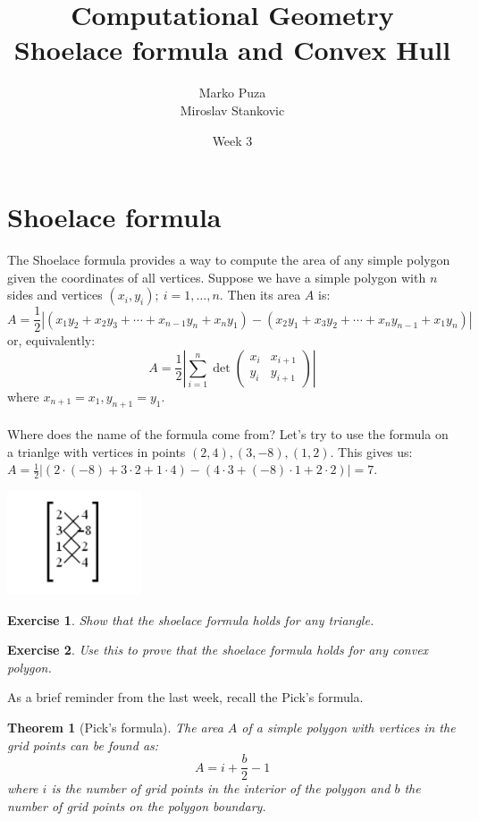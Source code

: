 \documentclass{article}
\title{\textbf{Computational Geometry}\\Shoelace formula and Convex Hull}
\date{Week 3}
\author{Marko Puza \\ Miroslav Stankovic}
\newtheorem*{theorem}{Theorem}
\newtheorem{exercise}{Exercise}
\begin{document}
\maketitle

\section*{Shoelace formula}
The Shoelace formula provides a way to compute the area of any simple polygon given the coordinates of all vertices. Suppose we have a simple polygon with $n$ sides and vertices $(x_i, y_i); \ i = 1, \dots, n$. Then its area $A$ is: \[A = \frac{1}{2} |(x_1 y_2 + x_2 y_3 + \cdots + x_{n-1} y_n + x_n y_1)  - (x_2 y_1 + x_3 y_2 + \cdots + x_n y_{n-1} + x_1 y_n)|\]
or, equivalently:
\[A = \frac{1}{2}|\sum_{i=1}^n \det{\left( \begin{smallmatrix} x_i&x_{i+1}\\ y_i&y_{i+1} \end{smallmatrix} \right)}|\]
where $x_{n+1} = x_1, y_{n+1} = y_1$. \\\\
Where does the name of the formula come from? Let's try to use the formula on a trianlge with vertices in points $(2, 4), (3, -8), (1, 2)$. This gives us: $A = \frac{1}{2} | (2 \cdot (-8) + 3 \cdot 2 + 1 \cdot 4) - (4 \cdot 3 + (-8) \cdot 1 + 2 \cdot 2) | = 7$.

\begin{center}
\includegraphics[width=4cm]{shoelace}
\end{center}

\begin{exercise}
    Show that the shoelace formula holds for any triangle.
\end{exercise}

\begin{exercise}
    Use this to prove that the shoelace formula holds for any convex polygon.
\end{exercise}

\noindent As a brief reminder from the last week, recall the Pick's formula.
\begin{theorem}[Pick's formula]
The area $A$ of a simple polygon with vertices in the grid points can be found as:
 \[A = i + \frac{b}{2} - 1\] where $i$ is the number of grid points in the interior of the polygon and $b$ the number of grid points on the polygon boundary. \\
\end{theorem}
\end{document}
